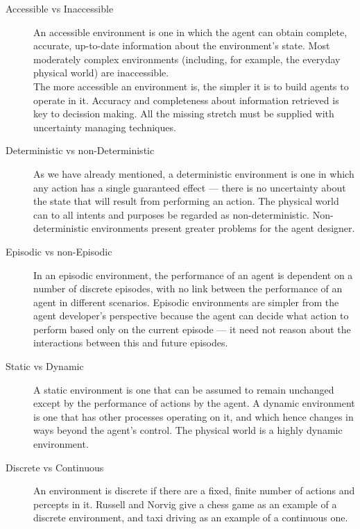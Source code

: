 \documentclass[11pt,oneside,a4paper,openright]{report}
\begin{document}
\begin{description} 
	\item [Accessible vs Inaccessible] An accessible environment is one in which the agent
		can obtain complete, accurate, up-to-date information about the environment’s state.
		Most moderately complex environments (including, for example, the everyday physical 
		world) are inaccessible.\\
		The more accessible an environment is, the simpler it is to build agents to operate in it.
		Accuracy and completeness about information retrieved is key to decission making.
		All the missing stretch must be supplied with uncertainty managing techniques.
	\item [Deterministic vs non-Deterministic] As we have already mentioned, a deterministic
		environment is one in which any action has a single guaranteed effect — there is no 
		uncertainty about the state that will result from performing an action.
		The physical world can to all intents and purposes be regarded as non-deterministic.
		Non-deterministic environments present greater problems for the agent designer.
	\item [Episodic vs non-Episodic] In an episodic environment, the performance of an
		agent is dependent on a number of discrete episodes, with no link between the performance
		of an agent in different scenarios. Episodic environments are simpler from the agent
		developer’s perspective because the agent can decide what action to perform based only 
		on the current episode — it need not reason about the interactions between this and future 
		episodes.
	\item [Static vs Dynamic] A static environment is one that can be assumed to remain unchanged 
		except by the performance of actions by the agent. A dynamic environment is one that has 
		other processes operating on it, and which hence changes in ways beyond the agent’s control.
		The physical world is a highly dynamic environment.
	\item [Discrete vs Continuous] An environment is discrete if there are a fixed, finite
		number of actions and percepts in it. Russell and Norvig give a chess game as 
		an example of a discrete environment, and taxi driving as an example of a continuous one.
\end{description}
\end{document}
